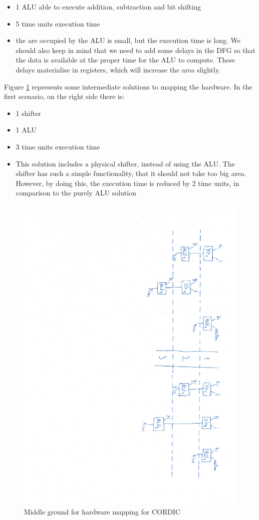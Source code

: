 \documentclass[12pt, a4paper,oneside]{article}
\begin{document}
\begin{itemize}
	\item 1 ALU able to execute addition, subtraction and bit shifting
	\item 5 time units execution time
	\item the are occupied by the ALU is small, but the execution time is long.
	We should also keep in mind that we need to add some delays in the DFG so
	that the data is available at the proper time for the ALU to compute. 
	These delays materialise in registers, which will increase the area slightly.
\end{itemize}

Figure \ref{fig:schedules_1} represents some intermediate solutions to mapping
the hardware. In the first scenario, on the right side there is:

\begin{itemize}
	\item 1 shifter
	\item 1 ALU
	\item 3 time units execution time
	\item This solution includes a physical shifter, instead of using the
	ALU. The shifter has such a simple functionality, that it should not take
	too big area. However, by doing this, the execution time is reduced by 2
	time units, in comparison to the purely ALU solution
\end{itemize}	

\begin{figure}[H]
	\centering
	\includegraphics[height = \textwidth,angle=91, trim=11.5cm 3.5cm 1.5cm 3.5cm, clip]{schedules_1.pdf}
	\caption{Middle ground for hardware mapping for CORDIC}
	\label{fig:schedules_1}
\end{figure}
\end{document}
